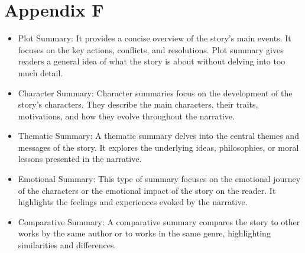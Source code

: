 \documentclass[11pt]{article}
\begin{document}
\section{Appendix F}
\label{appendix:f}
\begin{itemize}
  \item Plot Summary:
  It provides a concise overview of the story's main events. It focuses on the key actions, conflicts, and resolutions. Plot summary gives readers a general idea of what the story is about without delving into too much detail.
  \item Character Summary:
  Character summaries focus on the development of the story's characters. They describe the main characters, their traits, motivations, and how they evolve throughout the narrative.
  \item Thematic Summary:
  A thematic summary delves into the central themes and messages of the story. It explores the underlying ideas, philosophies, or moral lessons presented in the narrative.
  \item Emotional Summary:
  This type of summary focuses on the emotional journey of the characters or the emotional impact of the story on the reader. It highlights the feelings and experiences evoked by the narrative.
  \item Comparative Summary:
  A comparative summary compares the story to other works by the same author or to works in the same genre, highlighting similarities and differences.

\end{itemize}
\end{document}
